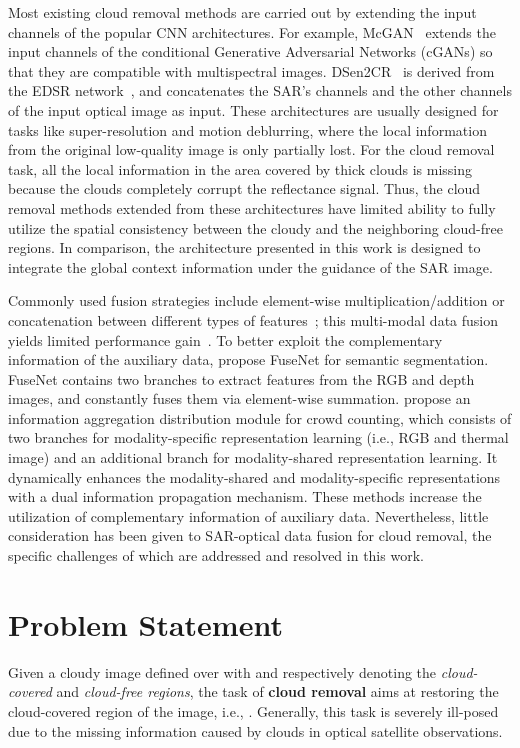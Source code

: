 \documentclass[a4paper,fleqn]{cas-dc}
\newcommand{\ie}[1]{{i.e.}}
\begin{document}
Most existing cloud removal methods are carried out by extending the input channels of the popular CNN architectures. For example, McGAN~\citep{enomoto2017filmy} extends the input channels of the conditional Generative Adversarial Networks (cGANs) so that they are compatible with multispectral images. DSen2CR~\citep{meraner2020cloud} is derived from the EDSR network~\citep{lim2017enhanced}, and concatenates the SAR's channels and the other channels of the input optical image as input. These architectures are usually designed for tasks like super-resolution and motion deblurring, where the local information from the original low-quality image is only partially lost. For the cloud removal task, all the local information in the area covered by thick clouds is missing because the clouds completely corrupt the reflectance signal. Thus, the cloud removal methods extended from these architectures have limited ability to fully utilize the spatial consistency between the cloudy and the neighboring cloud-free regions. 
In comparison, the architecture presented in this work is designed to integrate the global context information under the guidance of the SAR image.


Commonly used fusion strategies include element-wise multiplication/addition or concatenation between different types of features~\citep{sun2019leveraging, fu2020jl, xu2021motion}; this multi-modal data fusion yields limited performance gain~\citep{wu2018multi, audebert2018beyond, liu2021cross}.
To better exploit the complementary information of the auxiliary data, \cite{hazirbas2016fusenet} propose FuseNet for semantic segmentation. FuseNet contains two branches to extract features from the RGB and depth images, and constantly fuses them via element-wise summation. \cite{liu2021cross} propose an information aggregation distribution module for crowd counting, which consists of two branches for modality-specific representation learning (\ie{}, RGB and thermal image) and an additional branch for modality-shared representation learning. It dynamically enhances the modality-shared and modality-specific representations with a dual information propagation mechanism. These methods increase the utilization of complementary information of auxiliary data. Nevertheless, little consideration has been given to SAR-optical data fusion for cloud removal, the specific challenges of which are addressed and resolved in this work.


\section{Problem Statement}
Given a cloudy image  defined over  with  and  respectively denoting the {\it cloud-covered} and {\it cloud-free regions}, the task of {\bf cloud removal} aims at restoring the cloud-covered region of the image, \ie{}, . Generally, this task is severely ill-posed due to the missing information caused by clouds in optical satellite observations.
\end{document}
